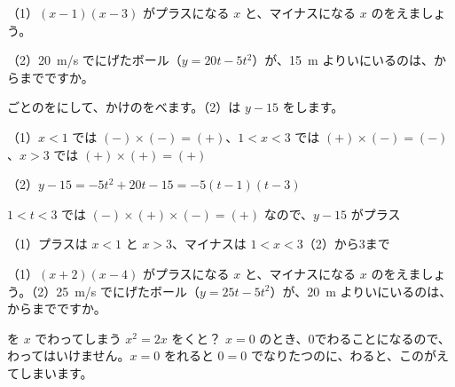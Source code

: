\begin{reidai}[\R{式}{しき}がプラスになるところ]
（1）\nobreak $(x-1)(x-3)$ がプラスになる $x$ と、マイナスになる $x$ のをえましょう。\par
（2）\nobreak \qty{20}{m/s} でにげたボール（$y=20t-5t^2$）が、\qty{15}{m} よりいにいるのは、からまでですか。\par
\kangaekata {}ごとのをにして、かけのをべます。（2）は $y-15$ をします。\par
\shiki（1）\nobreak $x<1$ では $(-)\times(-)=(+)$、$1<x<3$ では $(+)\times(-)=(-)$、$x>3$ では $(+)\times(+)=(+)$\par
\hspace*{2.6\zw}（2）\nobreak $y-15=-5t^2+20t-15=-5(t-1)(t-3)$\par
\hspace*{4.3\zw}$1<t<3$ では $(-)\times(+)\times(-)=(+)$ なので、$y-15$ がプラス\par
\kotae（1）\nobreak プラスは $x<1$ と $x>3$、マイナスは $1<x<3$\quad（2）から3まで
\end{reidai}

\begin{jibun}
（1）\nobreak $(x+2)(x-4)$ がプラスになる $x$ と、マイナスになる $x$ のをえましょう。\quad（2）\nobreak \qty{25}{m/s} でにげたボール（$y=25t-5t^2$）が、\qty{20}{m} よりいにいるのは、からまでですか。
\end{jibun}

\label{bk:3-10:tsuma}

\begin{tsumazuki}{を $x$ でわってしまう}
$x^2=2x$ をくと？
$x=0$ のとき、0でわることになるので、わってはいけません。$x=0$ をれると $0=0$ でなりたつのに、わると、このがえてしまいます。
\end{tsumazuki}

